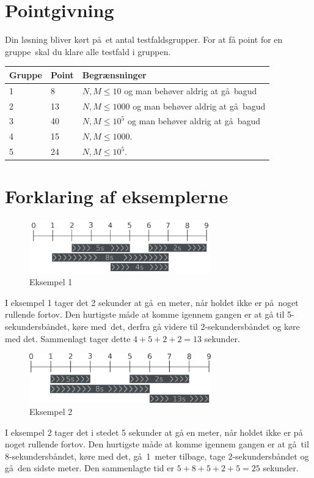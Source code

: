 \section*{Pointgivning}
Din løsning bliver kørt på et antal testfaldsgrupper.
For at få point for en gruppe skal du klare alle testfald i gruppen.

\noindent
\begin{tabular}{| l | l | l |}
\hline
Gruppe & Point & Begrænsninger \\ \hline
1     & 8          &  $N,M \le 10$ og man behøver aldrig at gå bagud\\ \hline
2     & 13         &  $N,M \le 1000$ og man behøver aldrig at gå bagud\\ \hline
3     & 40         &  $N,M \le 10^5$ og man behøver aldrig at gå bagud\\ \hline
4     & 15         &  $N,M \le 1000$. \\ \hline
5     & 24         &  $N,M \le 10^5$. \\ \hline
\end{tabular}

\section*{Forklaring af eksemplerne}

\begin{figure}[h]
	\centering
\includegraphics[width=0.7\textwidth]{sample1}
\caption{Eksempel 1}
\end{figure}
I eksempel 1 tager det 2 sekunder at gå en meter, når holdet ikke er på noget rullende fortov.
Den hurtigste måde at komme igennem gangen er at gå til 5-sekundersbåndet, køre med det, derfra gå videre til 2-sekundersbåndet og køre med det.
Sammenlagt tager dette $4+5+2+2=13$ sekunder.



\begin{figure}[h]
	\centering
\includegraphics[width=0.7\textwidth]{sample2}
\caption{Eksempel 2}
\end{figure}
I eksempel 2 tager det i stedet 5 sekunder at gå en meter, når holdet ikke er på noget rullende fortov.
Den hurtigste måde at komme igennem gangen er at gå til 8-sekundersbåndet, køre med det, gå 1~meter tilbage, tage 2-sekundersbåndet og gå den sidste meter.
Den sammenlagte tid er $5+8+5+2+5=25$ sekunder.
